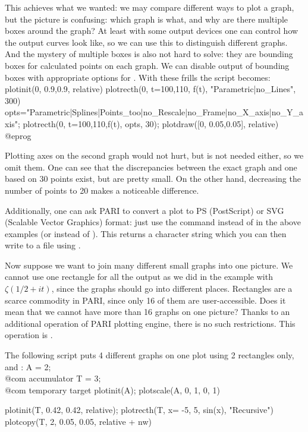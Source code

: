 This achieves what we wanted: we may compare different ways to plot a graph,
but the picture is confusing: which graph is what, and why are there multiple
boxes around the graph?  At least with some output devices one can control
how the output curves look like, so we can use this to distinguish different
graphs.  And the mystery of multiple boxes is also not hard to solve:
they are bounding boxes for calculated points on each graph.  We can disable
output of bounding boxes with appropriate options for .
With these frills the script becomes:
\bprog
plotinit(0, 0.9,0.9, relative)
plotrecth(0, t=100,110, f(t), "Parametric|no_Lines", 300)
opts="Parametric|Splines|Points_too|no_Rescale|no_Frame|no_X_axis|no_Y_axis";
plotrecth(0, t=100,110,f(t), opts, 30);
plotdraw([0, 0.05,0.05], relative)
@eprog

\noindent Plotting axes on the second graph would not hurt, but
is not needed either, so we omit them.  One can see that the discrepancies
between the exact graph and one based on 30 points exist, but are pretty
small.  On the other hand, decreasing the number of points to 20 makes
a noticeable difference.

Additionally, one can ask PARI to convert a plot to PS (PostScript)
or SVG (Scalable Vector Graphics) format: just use the command
 instead of  in the above examples (or
 instead of ). This returns a character string
which you can then write to a file using .

Now suppose we want to join many different small graphs into one picture.
We cannot use one rectangle for all the output as we did in the example
with $\zeta({1/2}+it)$, since the graphs should go into different places.
Rectangles are a scarce commodity in PARI, since only 16 of them are
user-accessible.  Does it mean that we cannot have more than 16 graphs on
one picture?  Thanks to an additional operation of PARI plotting engine,
there is no such restrictions.  This operation is .

The following script puts 4 different graphs on one plot using 2 rectangles
only,  and :
\bprog
  A = 2;   \\@com accumulator
  T = 3;   \\@com temporary target
  plotinit(A);         plotscale(A, 0, 1, 0, 1)

  plotinit(T, 0.42, 0.42, relative);
  plotrecth(T, x= -5, 5, sin(x), "Recursive")
  plotcopy(T, 2, 0.05, 0.05, relative + nw)

